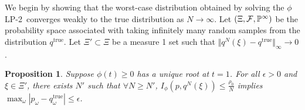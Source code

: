 \documentclass[12pt]{article}
\renewcommand{\P}{\mathbb{P}}
\newcommand{\qtrue}{q^{\text{true}}}
\theoremstyle{plain}
\newtheorem{proposition}[theorem]{Proposition}
\theoremstyle{definition}
\theoremstyle{remark}
\newcommand{\plp}{$\phi$LP-2}
\begin{document}
We begin by showing that the worst-case distribution obtained by solving the \plp\ converges weakly to the true distribution as $N \rightarrow \infty$.
Let $(\Xi,{\cal F},\P^\infty)$ be the probability space associated with taking infinitely many random samples from the distribution $\qtrue$.
Let $\Xi' \subset \Xi$ be a measure 1 set such that $\Vert q^N(\xi) - \qtrue \Vert_\infty \rightarrow 0$.

\begin{proposition} \label{prop:weak_conv}
	Suppose $\phi(t) \geq 0$ has a unique root at $t = 1$.
	For all $\epsilon > 0$ and $\xi \in \Xi'$, there exists $N'$ such that $\forall N \geq N'$, $I_{\phi}(p,q^N(\xi)) \leq \frac{\rho_0}{N}$ implies $\max_\omega |p_\omega - \qtrue_\omega| \leq \epsilon$.
\end{proposition}
\end{document}
